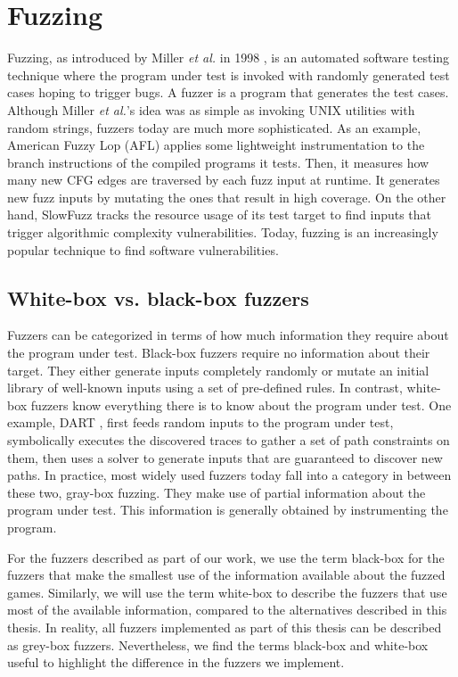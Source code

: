 \section{Fuzzing}
Fuzzing, as introduced by Miller \textit{et al.} in 1998 \cite{Miller1999}, is an automated software testing technique where the program under test is invoked with randomly generated test cases hoping to trigger bugs.
A fuzzer is a program that generates the test cases. Although Miller \textit{et al.}'s idea was as simple as invoking UNIX utilities with random strings, fuzzers today are much more sophisticated.
As an example, American Fuzzy Lop (AFL) \cite{AFL} applies some lightweight instrumentation to the branch instructions of the compiled programs it tests.
Then, it measures how many new CFG edges are traversed by each fuzz input at runtime.
It generates new fuzz inputs by mutating the ones that result in high coverage.
On the other hand, SlowFuzz \cite{Slowfuzz} tracks the resource usage of its test target to find inputs that trigger algorithmic complexity vulnerabilities.
Today, fuzzing is an increasingly popular technique to find software vulnerabilities.

\subsection{White-box vs. black-box fuzzers}
Fuzzers can be categorized in terms of how much information they require about the program under test.
Black-box fuzzers require no information about their target.
They either generate inputs completely randomly or mutate an initial library of well-known inputs using a set of pre-defined rules.
In contrast, white-box fuzzers know everything there is to know about the program under test.
One example, DART \cite{Dart}, first feeds random inputs to the program under test, symbolically executes the discovered traces to gather a set of path constraints on them, then uses a solver to generate inputs that are guaranteed to discover new paths.
In practice, most widely used fuzzers today fall into a category in between these two, gray-box fuzzing.
They make use of partial information about the program under test.
This information is generally obtained by instrumenting the program.

For the fuzzers described as part of our work, we use the term black-box for the fuzzers that make the smallest use of the information available about the fuzzed games.
Similarly, we will use the term white-box to describe the fuzzers that use most of the available information, compared to the alternatives described in this thesis.
In reality, all fuzzers implemented as part of this thesis can be described as grey-box fuzzers.
Nevertheless, we find the terms black-box and white-box useful to highlight the difference in the fuzzers we implement.

